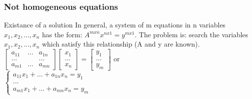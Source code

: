 \begin{frame}
	\frametitle{Not homogeneous equations}
	\begin{block}{Existance of a solution}
		In general, a system of m equations in n variables $x_1,x_2,...,x_n$ has the form: $A^{mxn}x^{nx1}=y^{mx1}$. The problem is: search the variables $x_1,x_2,...,x_n$ which satisfy this relationship (A and y are known).\\
		$\begin{bmatrix}
		a_{11} & ... & a_{1n}\\
		... & & ...\\
		a_{m1} & ... & a_{mn}
		\end{bmatrix} \begin{bmatrix}
		x_1\\
		...\\
		x_n 
		\end{bmatrix}=\begin{bmatrix} y_1\\...\\y_m\end{bmatrix}$ or\\
		$\begin{cases}
		a_{11}x_1+...+a_{1n}x_n=y_1\\
		...\\
		a_{m1}x_1+...+a_{mn}x_n=y_m
		\end{cases}$\\
	\end{block}
\end{frame}

